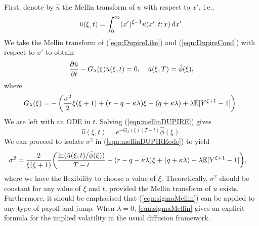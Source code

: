 First, denote by $\hat u$ the Mellin transform of $u$ with respect to $x'$, i.e.,
	\begin{equation*}
		\hat u(\xi,t) = \int_0^\infty (x')^{\xi-1} u(x',t; x) \, \mathrm d x'.
	\end{equation*}
We take the Mellin transform of (\ref{eqn:DupireLike}) and (\ref{eqn:DupireCond}) with respect to $x'$ to obtain
	\begin{align}
		\label{eqn:mellinDUPIRE}
		\begin{split}
			\frac{\partial \hat u}{\partial t} - G_{\lambda}(\xi)\hat u(\xi,t) = 0, \quad \hat u(\xi,T) = \hat \phi(\xi),
		\end{split}
	\end{align}
where
	\begin{equation}
		G_{\lambda}(\xi) = -\left( \frac{\sigma^2}{2}\xi(\xi+1) + (r - q - \kappa\lambda)\xi - (	q + \kappa\lambda) + \lambda\mathbb E[Y^{\xi+1} - 1] \right).
	\end{equation}
We are left with an ODE in $t$. Solving (\ref{eqn:mellinDUPIRE}) gives
	\begin{equation}
		\label{eqn:mellinDUPIREode}
		\hat u(\xi,t) = e^{-G_{\lambda}(\xi)(T-t)}\hat \phi(\xi).
	\end{equation}
We can proceed to isolate $\sigma^2$ in (\ref{eqn:mellinDUPIREode}) to yield
	\begin{align}
		\label{eqn:sigmaMellin}
		\begin{split}
		\sigma^2 &= \frac{2}{\xi(\xi+1)}\bigg( \frac{\ln( \hat u(\xi,t)/\hat\phi(\xi) )}{T-t} - (r-q-\kappa\lambda)\xi + (q+\kappa\lambda) - \lambda\mathbb E[Y^{\xi+1} - 1] \bigg),
		\end{split}
	\end{align}
where we have the flexibility to choose a value of $\xi$. Theoretically, $\sigma^2$ should be constant for any value of $\xi$ and $t$, provided the Mellin transform of $u$ exists. Furthermore, it should be emphasised that (\ref{eqn:sigmaMellin}) can be applied to any type of payoff and jump. When $\lambda = 0$, \eqref{eqn:sigmaMellin} gives an explicit formula for the implied volatility in the usual diffusion framework.

